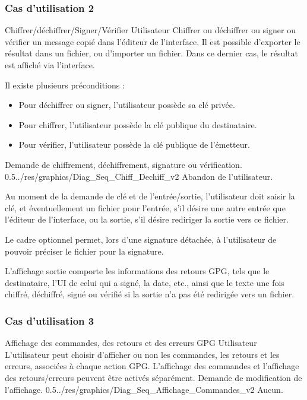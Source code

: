 \documentclass{../res/univ-projet}
\begin{document}
\subsubsection{Cas d'utilisation 2}
\ficheGraphic
{Chiffrer/déchiffrer/Signer/Vérifier}
{Utilisateur}
{Chiffrer ou déchiffrer ou signer ou vérifier un message copié dans l'éditeur de l'interface. Il est possible d'exporter le résultat dans un fichier, ou d'importer un fichier. Dans ce dernier cas, le résultat est affiché via l'interface.}
{
  Il existe plusieurs préconditions :
  \begin{itemize}
    \item Pour déchiffrer ou signer, l'utilisateur possède sa clé privée.
    \item Pour chiffrer, l'utilisateur possède la clé publique du destinataire.
    \item Pour vérifier, l'utilisateur possède la clé publique de l'émetteur.
  \end{itemize}
}
{Demande de chiffrement, déchiffrement, signature ou vérification.}
{}
{0.5}{../res/graphics/Diag_Seq_Chiff_Dechiff_v2}
{Abandon de l'utilisateur.}
\vspace{0.5cm}

Au moment de la demande de clé et de l'entrée/sortie, l'utilisateur doit saisir la clé, et éventuellement un fichier pour l'entrée, s'il désire une autre entrée que l'éditeur de l'interface, ou la sortie, s'il désire rediriger la sortie vers ce fichier.

Le cadre optionnel permet, lors d'une signature détachée, à l'utilisateur de pouvoir préciser le fichier pour la signature.

L'affichage sortie comporte les informations des retours GPG, tels que le destinataire, l'UI de celui qui a signé, la date, etc., ainsi que le texte une fois chiffré, déchiffré, signé ou vérifié si la sortie n'a pas été redirigée vers un fichier.

\subsubsection{Cas d'utilisation 3}
\ficheGraphic
{Affichage des commandes, des retours et des erreurs GPG}
{Utilisateur}
{L'utilisateur peut choisir d'afficher ou non les commandes, les retours et les erreurs, associées à chaque action GPG. L'affichage des commandes et l'affichage des retours/erreurs peuvent être activés séparément.}
{}
{Demande de modification de l'affichage.}
{}
{0.5}{../res/graphics/Diag_Seq_Affichage_Commandes_v2}
{Aucun.}   
\vspace{0.5cm}
\end{document}
